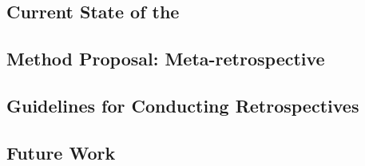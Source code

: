 \subsection{Current State of the}

\subsection{Method Proposal: Meta-retrospective}

\subsection{Guidelines for Conducting Retrospectives}

\subsection{Future Work}
\clearpage
